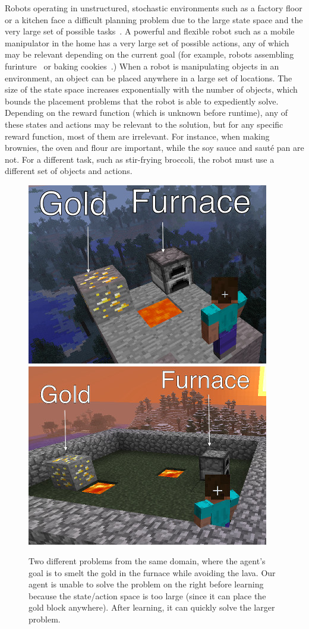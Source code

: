 Robots operating in unstructured, stochastic environments such as a
factory floor or a kitchen face a difficult planning problem due to
the large state space and the very large set of possible
tasks~\citep{bollini12,knepper13}.  A powerful and flexible robot such
as a mobile manipulator in the home has a very large set of possible
actions, any of which may be relevant depending on the current goal
(for example, robots assembling furinture~\citep{knepper13} or baking
cookies~\citep{bollini12}.)  When a robot is manipulating objects in
an environment, an object can be placed anywhere in a large set of
locations.  The size of the state space increases exponentially with
the number of objects, which bounds the placement problems that the
robot is able to expediently solve.  Depending on the reward function
(which is unknown before runtime), any of these states and actions may
be relevant to the solution, but for any specific reward function,
most of them are irrelevant.  For instance, when making brownies, the
oven and flour are important, while the soy sauce and saut\'{e} pan
are not.  For a different task, such as stir-frying broccoli, the
robot must use a different set of objects and
actions. 
\begin{figure}
\centering
\includegraphics[width=0.2\linewidth]{figures/smelt_small.jpg}
\includegraphics[width=0.2\linewidth]{figures/smelt_large.jpg}
\caption{Two different problems from the same domain, where the
  agent's goal is to smelt the gold in the furnace while avoiding the
  lava.  Our agent is unable to solve the problem on the right before
  learning because the state/action space is too large (since it can
  place the gold block anywhere).  After learning, it can quickly
  solve the larger problem.\label{fig:example}}
\end{figure}

